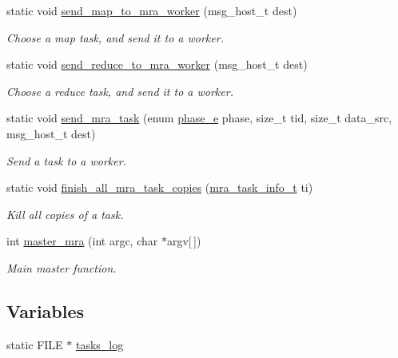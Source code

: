 \begin{DoxyCompactItemize}
static void \hyperlink{master-mra_8c_a54a5360a29540b0302528bf7c22af577}{send\-\_\-map\-\_\-to\-\_\-mra\-\_\-worker} (msg\-\_\-host\-\_\-t dest)
\begin{DoxyCompactList}\small\item\em \-Choose a map task, and send it to a worker. \end{DoxyCompactList}\item 
static void \hyperlink{master-mra_8c_a11c1ba3e81b04f147dddbfcc637ffd1f}{send\-\_\-reduce\-\_\-to\-\_\-mra\-\_\-worker} (msg\-\_\-host\-\_\-t dest)
\begin{DoxyCompactList}\small\item\em \-Choose a reduce task, and send it to a worker. \end{DoxyCompactList}\item 
static void \hyperlink{master-mra_8c_ad1217d5b8cdd99a1e7b3755a9761d4ee}{send\-\_\-mra\-\_\-task} (enum \hyperlink{mra_8h_afa14b6e068c0e0b8557777e16f2582f2}{phase\-\_\-e} phase, size\-\_\-t tid, size\-\_\-t data\-\_\-src, msg\-\_\-host\-\_\-t dest)
\begin{DoxyCompactList}\small\item\em \-Send a task to a worker. \end{DoxyCompactList}\item 
static void \hyperlink{master-mra_8c_abb91a100f0067b79a6d171ee510df540}{finish\-\_\-all\-\_\-mra\-\_\-task\-\_\-copies} (\hyperlink{common-mra_8h_a54f41524090023e9b283ecbef8b955d6}{mra\-\_\-task\-\_\-info\-\_\-t} ti)
\begin{DoxyCompactList}\small\item\em \-Kill all copies of a task. \end{DoxyCompactList}\item 
int \hyperlink{master-mra_8c_afc38789b94eade9a7b1c6ae97a784af1}{master\-\_\-mra} (int argc, char $\ast$argv\mbox{[}$\,$\mbox{]})
\begin{DoxyCompactList}\small\item\em \-Main master function. \end{DoxyCompactList}\end{DoxyCompactItemize}
\subsection*{\-Variables}
\begin{DoxyCompactItemize}
\item 
static \-F\-I\-L\-E $\ast$ \hyperlink{master-mra_8c_a42ff89a9ffd23ba410ff217181554f6c}{tasks\-\_\-log}
\end{DoxyCompactItemize}


